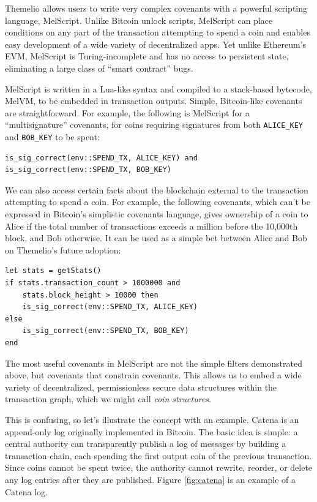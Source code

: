 \documentclass[headinclude,12pt]{scrbook}
\begin{document}
Themelio allows users to write very complex covenants with a powerful scripting language, MelScript. Unlike Bitcoin unlock scripts, MelScript can place conditions on any part of the transaction attempting to spend a coin and enables easy development of a wide variety of decentralized apps. Yet unlike Ethereum's EVM, MelScript is Turing-incomplete and has no access to persistent state, eliminating a large class of ``smart contract'' bugs.

MelScript is written in a Lua-like syntax and compiled to a stack-based bytecode, MelVM, to be embedded in transaction outputs. Simple, Bitcoin-like covenants are straightforward. For example, the following is MelScript for a ``multisignature'' covenants, for coins requiring signatures from both \texttt{ALICE\_KEY} and \texttt{BOB\_KEY} to be spent:
\begin{lstlisting}
is_sig_correct(env::SPEND_TX, ALICE_KEY) and
is_sig_correct(env::SPEND_TX, BOB_KEY)
\end{lstlisting}

We can also access certain facts about the blockchain external to the transaction attempting to spend a coin. For example, the following covenants, which can't be expressed in Bitcoin's simplistic covenants language, gives ownership of a coin to Alice if the total number of transactions exceeds a million before the 10,000th block, and Bob otherwise. It can be used as a simple bet between Alice and Bob on Themelio's future adoption:
\begin{lstlisting}
let stats = getStats()
if stats.transaction_count > 1000000 and 
    stats.block_height > 10000 then
    is_sig_correct(env::SPEND_TX, ALICE_KEY)
else
    is_sig_correct(env::SPEND_TX, BOB_KEY)
end
\end{lstlisting}

The most useful covenants in MelScript are not the simple filters demonstrated above, but covenants that constrain covenants. This allows us to embed a wide variety of decentralized, permissionless secure data structures within the transaction graph, which we might call \emph{coin structures}.

This is confusing, so let's illustrate the concept with an example. Catena \cite{tomescu2017catena} is an append-only log originally implemented in Bitcoin. The basic idea is simple: a central authority can transparently publish a log of messages by building a transaction chain, each spending the first output coin of the previous transaction. Since coins cannot be spent twice, the authority cannot rewrite, reorder, or delete any log entries after they are published. Figure \ref{fig:catena} is an example of a Catena log.
\end{document}
